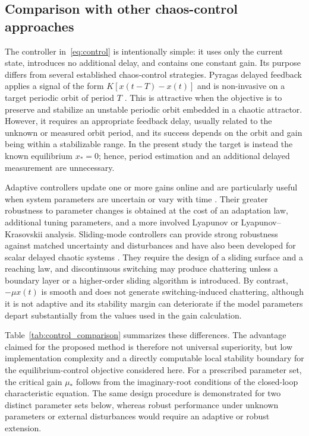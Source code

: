 \documentclass[11pt]{article}
\theoremstyle{remark}
\begin{document}
{
\subsection*{Comparison with other chaos-control approaches}

The controller in~\eqref{eq:control} is intentionally simple: it uses only the current state, introduces no additional delay, and contains one constant gain. Its purpose differs from several established chaos-control strategies. Pyragas delayed feedback applies a signal of the form $K[x(t-T)-x(t)]$ and is non-invasive on a target periodic orbit of period $T$ \cite{pyragas1992continuous}. This is attractive when the objective is to preserve and stabilize an unstable periodic orbit embedded in a chaotic attractor. However, it requires an appropriate feedback delay, usually related to the unknown or measured orbit period, and its success depends on the orbit and gain being within a stabilizable range. In the present study the target is instead the known equilibrium $x_*=0$; hence, period estimation and an additional delayed measurement are unnecessary.

Adaptive controllers update one or more gains online and are particularly useful when system parameters are uncertain or vary with time \cite{tian1998adaptive,rezaie2011adaptive}. Their greater robustness to parameter changes is obtained at the cost of an adaptation law, additional tuning parameters, and a more involved Lyapunov or Lyapunov--Krasovskii analysis. Sliding-mode controllers can provide strong robustness against matched uncertainty and disturbances and have also been developed for scalar delayed chaotic systems \cite{vasegh2009sliding}. They require the design of a sliding surface and a reaching law, and discontinuous switching may produce chattering unless a boundary layer or a higher-order sliding algorithm is introduced. By contrast, $-\mu x(t)$ is smooth and does not generate switching-induced chattering, although it is not adaptive and its stability margin can deteriorate if the model parameters depart substantially from the values used in the gain calculation.

Table~\ref{tab:control_comparison} summarizes these differences. The advantage claimed for the proposed method is therefore not universal superiority, but low implementation complexity and a directly computable local stability boundary for the equilibrium-control objective considered here. For a prescribed parameter set, the critical gain $\mu_*$ follows from the imaginary-root conditions of the closed-loop characteristic equation. The same design procedure is demonstrated for two distinct parameter sets below, whereas robust performance under unknown parameters or external disturbances would require an adaptive or robust extension.
}
\end{document}
